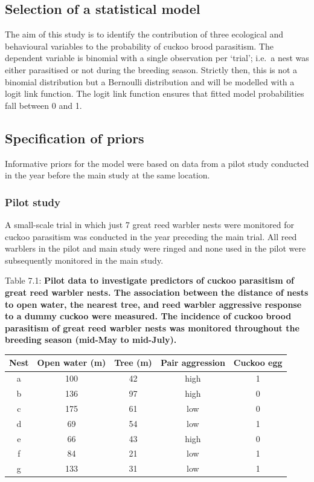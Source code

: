 \documentclass[
]{book}
\begin{document}
\hypertarget{bern-select}{%
\subsection{Selection of a statistical model}\label{bern-select}}

The aim of this study is to identify the contribution of three ecological and behavioural variables to the probability of cuckoo brood parasitism. The dependent variable is binomial with a single observation per `trial'; i.e.~a nest was either parasitised or not during the breeding season. Strictly then, this is not a binomial distribution but a Bernoulli distribution and will be modelled with a logit link function. The logit link function ensures that fitted model probabilities fall between 0 and 1.

\hypertarget{bern-prior-spec}{%
\subsection{Specification of priors}\label{bern-prior-spec}}

Informative priors for the model were based on data from a pilot study conducted in the year before the main study at the same location.

\hypertarget{pilot-study}{%
\subsubsection{Pilot study}\label{pilot-study}}

A small-scale trial in which just 7 great reed warbler nests were monitored for cuckoo parasitism was conducted in the year preceding the main trial. All reed warblers in the pilot and main study were ringed and none used in the pilot were subsequently monitored in the main study.

Table 7.1: \textbf{Pilot data to investigate predictors of cuckoo parasitism of great reed warbler nests. The association between the distance of nests to open water, the nearest tree, and reed warbler aggressive response to a dummy cuckoo were measured. The incidence of cuckoo brood parasitism of great reed warbler nests was monitored throughout the breeding season (mid-May to mid-July).}

\begin{longtable}[]{@{}ccccc@{}}
\toprule
Nest & Open water (m) & Tree (m) & Pair aggression & Cuckoo egg \\
\midrule
\endhead
a & 100 & 42 & high & 1 \\
b & 136 & 97 & high & 0 \\
c & 175 & 61 & low & 0 \\
d & 69 & 54 & low & 1 \\
e & 66 & 43 & high & 0 \\
f & 84 & 21 & low & 1 \\
g & 133 & 31 & low & 1 \\
\bottomrule
\end{longtable}
\end{document}
